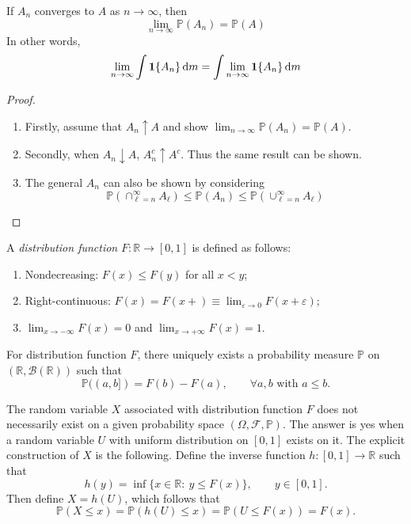 \begin{theorem}
If $A_n$ converges to $A$ as $n\to\infty$, then
\[
\lim_{n\to\infty}\mathbb{P}(A_n) = \mathbb{P}(A)
\]
In other words,
\[
\lim_{n\to\infty}
\int
\bm 1\{A_n\}
\,\mathrm{d} m 
=
\int\lim_{n\to\infty}\bm 1\{A_n\}\,\mathrm{d} m 
\]
\end{theorem}


\begin{proof}
\begin{enumerate}
\item
Firstly, assume that $A_n\uparrow A$ and show $\lim_{n\to\infty}\mathbb{P}(A_n) = \mathbb{P}(A)$.
\item
Secondly, when $A_n\downarrow A$, $A_n^c\uparrow A^c$. Thus the same result can be shown.
\item
The general $A_n$ can also be shown by considering
\[
\mathbb{P}\left(
\cap_{\ell=n}^\infty A_{\ell}
\right)
\le
\mathbb{P}(A_n)
\le
\mathbb{P}\left(
\cup_{\ell=n}^\infty A_{\ell}
\right)
\]
\end{enumerate}
\end{proof}


\begin{definition}
A \emph{distribution function} $F:\mathbb{R}\to[0,1]$ is defined as follows:
\begin{enumerate}
\item
Nondecreasing: $F(x)\le F(y)$ for all $x<y$;
\item
Right-continuous: $F(x)=F(x+)\equiv\lim_{\varepsilon\to 0}F(x+\varepsilon)$;
\item
$\lim_{x\to-\infty}F(x)=0$ and $\lim_{x\to+\infty}F(x)=1$.
\end{enumerate}
\end{definition}

\begin{proposition}
For distribution function $F$, there uniquely exists a probability measure $\mathbb{P}$
on $(\mathbb{R},\mathcal{B}(\mathbb{R}))$ such that 
\[
\mathbb{P}((a,b]) = F(b) - F(a),\qquad\forall a,b\text{ with }a\le b.
\]
\end{proposition}

The random variable $X$ associated with distribution function $F$ does not necessarily exist
on a given probability space $(\Omega,\mathcal{F},\mathbb{P})$.
The answer is yes when a random variable $U$ with uniform distribution on $[0,1]$
exists on it.
The explicit construction of $X$ is the following.
Define the inverse function $h:[0,1]\to\mathbb{R}$ such that
\[
h(y) = \inf\{x\in\mathbb{R}:~y\le F(x)\},\qquad y\in[0,1].
\]
Then define $X=h(U)$, which follows that
\[
\mathbb{P}(X\le x) = \mathbb{P}(h(U)\le x) = \mathbb{P}(U\le F(x)) = F(x).
\]









